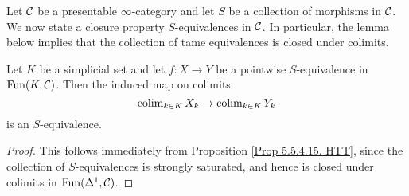 Let ${\mathcal{C}}$ be a presentable $\infty$-category and let $S$ be a collection of morphisms in ${\mathcal{C}}$.
We now state a closure property $S$-equivalences in ${\mathcal{C}}$. In particular, the lemma below implies that the collection of tame equivalences is closed under colimits.
\begin{lemma}
\label{closure property of tame equivalences}
		Let $K$ be a simplicial set and
		let $f:X\to Y$ be a pointwise $S$-equivalence in $\operatorname{Fun}(K,{\mathcal{C}})$.
	Then the induced map on colimits 
		$$
		\operatorname{colim}_{k\in K}X_k \to \operatorname{colim}_{k\in K}Y_k
		$$ is an $S$-equivalence.
		
\end{lemma}
\begin{proof}
    This follows immediately from Proposition \ref{Prop 5.5.4.15. HTT}, since the collection of $S$-equivalences is strongly saturated, and hence is closed under colimits in $\operatorname{Fun}(\Delta^1, {\mathcal{C}})$.
\end{proof}

		


